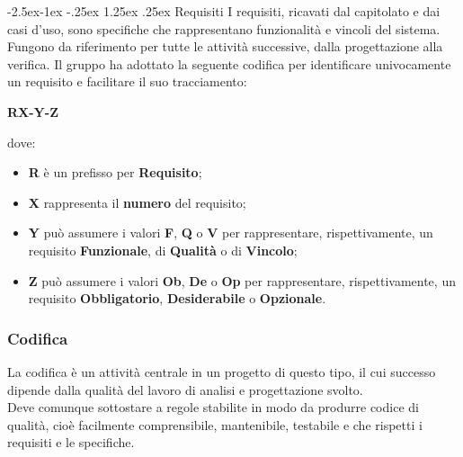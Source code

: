 \documentclass[a4paper,12pt]{article}
\makeatletter
\renewcommand\paragraph{\@startsection{paragraph}{4}{\z@}%
            {-2.5ex\@plus -1ex \@minus -.25ex}%
            {1.25ex \@plus .25ex}%
            {\normalfont\normalsize\bfseries}}
\makeatother
\begin{document}
            \paragraph{Requisiti}
                I requisiti, ricavati dal capitolato e dai casi d'uso, sono specifiche che rappresentano funzionalità e vincoli del sistema.
                Fungono da riferimento per tutte le attività successive, dalla progettazione alla verifica.
                Il gruppo ha adottato la seguente codifica per identificare univocamente un requisito e facilitare il suo tracciamento:
                \begin{center}
                    \textbf{RX-Y-Z}
                \end{center}
                dove:
                \begin{itemize}
                    \item \textbf{R} è un prefisso per \textbf{Requisito};
                    \item \textbf{X} rappresenta il \textbf{numero} del requisito;
                    \item \textbf{Y} può assumere i valori \textbf{F}, \textbf{Q} o \textbf{V} per rappresentare, rispettivamente, un requisito \textbf{Funzionale}, di \textbf{Qualità} o di \textbf{Vincolo};
                    \item \textbf{Z} può assumere i valori \textbf{Ob}, \textbf{De} o \textbf{Op} per rappresentare, rispettivamente, un requisito \textbf{Obbligatorio}, \textbf{Desiderabile} o \textbf{Opzionale}.
                \end{itemize}
        
        \subsubsection{Codifica}
            La codifica è un attività centrale in un progetto di questo tipo, il cui successo dipende dalla qualità del lavoro di analisi e progettazione svolto.\\
            Deve comunque sottostare a regole stabilite in modo da produrre codice di qualità, cioè facilmente comprensibile, mantenibile, testabile e che rispetti i requisiti e le specifiche.
\end{document}
